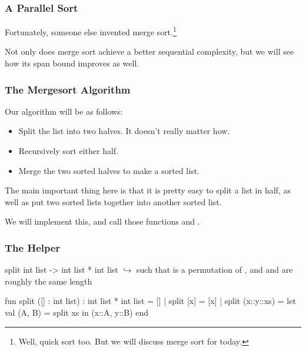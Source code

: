 \documentclass[aspectratio=169, handout]{beamer}
\begin{document}
\begin{frame}[fragile]
  \frametitle{A Parallel Sort}

  Fortunately, someone else invented merge sort.\footnote{
    Well, quick sort too. But we will discuss merge sort for today.
  }

  \pause
  \vspace{\fill}


  \pause
  \vspace{\fill}

  Not only does merge sort achieve a better sequential complexity, but we will
  see how its span bound improves as well.
\end{frame}

\begin{frame}[fragile]
  \frametitle{The Mergesort Algorithm}

  Our algorithm will be as follows:

  \pause
  \begin{itemize}
    \item Split the list into two halves. It doesn't really matter how. \pause
    \item Recursively sort either half. \pause
    \item Merge the two sorted halves to make a sorted list.
  \end{itemize}

  \pause
  \vspace{\fill}

  The main important thing here is that it is pretty easy to split a list in
  half, as well as put two sorted lists together into another sorted list.

  \pause
  \vspace{\fill}

  We will implement this, and call those functions  and .
\end{frame}

\begin{frame}[fragile]
  \frametitle{The  Helper}

  \spec
    {split}
    {int list -> int list * int list}
    {}
    { $\hookrightarrow$  such that  is a
    permutation of , and  and  are roughly the
    same length}

  \pause
  \vspace{\fill}

  \begin{codeblock}
    fun split ([] : int list) : int list * int list = []
      | split [x] = [x]
      | split (x::y::xs) =
          let
            val (A, B) = split xs
          in
            (x::A, y::B)
          end
  \end{codeblock}
\end{frame}
\end{document}
